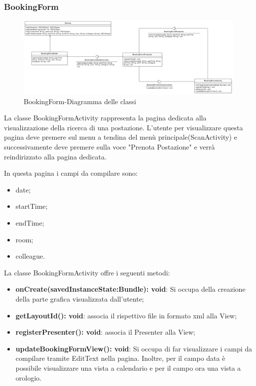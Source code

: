 \subsubsection{BookingForm}
\begin{figure}[H]
	\centering
	\includegraphics[width=16cm]{res/images/BookingForm.png}
	\caption{BookingForm-Diagramma delle classi}
	\label{fig:BookingForm-Diagramma delle classi}
\end{figure}
La classe BookingFormActivity rappresenta la pagina dedicata alla visualizzazione della ricerca di una postazione.
L'utente per visualizzare questa pagina deve premere sul menu a tendina del menù principale(ScanActivity) e successivamente deve premere sulla voce "Prenota Postazione" e verrà reindirizzato alla pagina dedicata.

In questa pagina i campi da compilare sono: 
\begin{itemize}
	\item date; 
	\item startTime; 
	\item endTime; 
	\item room; 
	\item colleague. 
\end{itemize}

La classe BookingFormActivity offre i seguenti metodi:
\begin{itemize}
	\item \textbf{onCreate(savedInstanceState:Bundle): void}: Si occupa della creazione della parte grafica visualizzata dall'utente; 
	\item \textbf{getLayoutId(): void}: associa il rispettivo file in formato xml alla View;
	\item \textbf{registerPresenter(): void}: associa il Presenter alla View; 
	\item \textbf{updateBookingFormView(): void}: Si occupa di far visualizzare i campi da compilare tramite EditText nella pagina. Inoltre, per il campo data è possibile visualizzare una vista a calendario e per il campo ora una vista a orologio.
\end{itemize}


